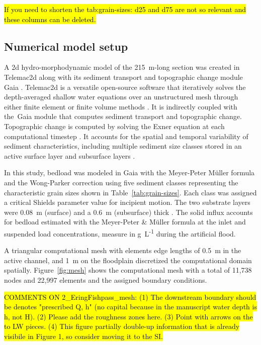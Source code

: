 \documentclass[draft,linenumbers,onecolumn]{agujournal2019} %
\begin{document}
  \hl{If you need to shorten the tab:grain-sizes: d25 and d75 are not so relevant and these columns can be deleted.}

\subsection{Numerical model setup}
\label{sec:numerical-model}

A 2d hydro-morphodynamic model of the 215~m-long section was created in Telemac2d \cite{hervouet2020telemac2d} along with its sediment transport and topographic change module Gaia \cite{tassi2023gaia}. Telemac2d is a  versatile open-source software that iteratively solves the depth-averaged shallow water equations \cite{saint-venant1871theorie} over an unstructured mesh through either finite element or finite volume methods \cite{galland1991telemac,hervouet2007hydrodynamics}. It is indirectly coupled with the Gaia module that computes sediment transport and topographic change.  Topographic change is computed by solving the Exner equation at each computational timestep \cite{exner1925uber,audouin2020introducing}. It accounts for the spatial and temporal variability of sediment characteristics, including multiple sediment size classes stored in an active surface layer and subsurface layers \cite{hirano1971riverbed}. 

In this study, bedload was modeled in Gaia with the Meyer-Peter Müller formula \cite{meyer-peter1948formulas} and the Wong-Parker correction \cite{wong2006reanalysis} using five sediment classes representing the characteristic grain sizes shown in Table~\ref{tab:grain-sizes}. Each class was assigned a critical Shields parameter \cite{shields1936anwendung} value for incipient motion. The two substrate layers were 0.08~m (surface) and a 0.6~m (subsurface) thick \cite{scolari2025hydromorphodynamic}. The solid influx accounts for bedload estimated with the Meyer-Peter \& Müller formula at the inlet and suspended load concentrations, measure in g~L\textsuperscript{-1} during the artificial flood.

A triangular computational mesh with elements edge lengths of 0.5~m in the active channel, and 1~m on the floodplain discretized the computational domain spatially. Figure~\ref{fig:mesh} shows the computational mesh with a total of 11,738 nodes and 22,997 elements and the assigned boundary conditions.

\hl{COMMENTS ON 2\_EringFishpass\_mesh: (1) The downstream boundary should be denotes "prescribed Q, h" (no capital because in the manuscript water depth is h, not H). (2) Please add the roughness zones here. (3) Point with arrows on the to LW pieces. (4) This figure partially double-up information that is already visibile in Figure 1, so consider moving it to the SI.}
\end{document}
